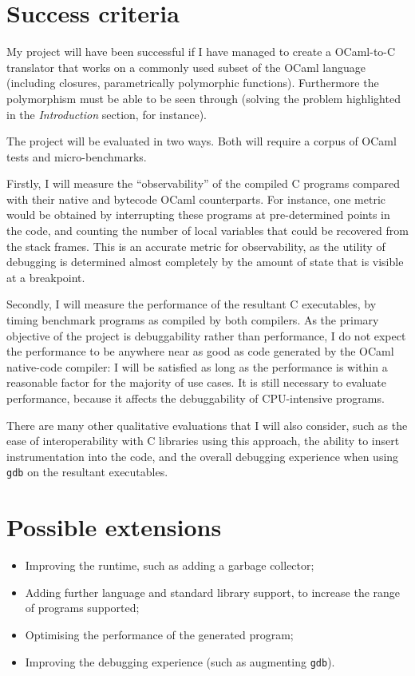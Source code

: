 \documentclass[12pt,twoside,a4paper]{article}
\begin{document}
\section*{Success criteria}

My project will have been successful if I have managed to create a OCaml-to-C translator that works on a commonly used subset of the OCaml language (including closures, parametrically polymorphic functions). Furthermore the polymorphism must be able to be seen through (solving the problem highlighted in the \textit{Introduction} section, for instance).

The project will be evaluated in two ways. Both will require a corpus of OCaml tests and micro-benchmarks.

Firstly, I will measure the ``observability'' of the compiled C programs compared with their native and bytecode OCaml counterparts. For instance, one metric would be obtained by interrupting these programs at pre-determined points in the code, and counting the number of local variables that could be recovered from the stack frames. This is an accurate metric for observability, as the utility of debugging is determined almost completely by the amount of state that is visible at a breakpoint.

Secondly, I will measure the performance of the resultant C executables, by timing benchmark programs as compiled by both compilers. As the primary objective of the project is debuggability rather than performance, I do not expect the performance to be anywhere near as good as code generated by the OCaml native-code compiler: I will be satisfied as long as the performance is within a reasonable factor for the majority of use cases. It is still necessary to evaluate performance, because it affects the debuggability of CPU-intensive programs.

There are many other qualitative evaluations that I will also consider, such as the ease of interoperability with C libraries using this approach, the ability to insert instrumentation into the code, and the overall debugging experience when using \lstinline{gdb} on the resultant executables.

\section*{Possible extensions}

\begin{itemize}
  \item Improving the runtime, such as adding a garbage collector;
  \item Adding further language and standard library support, to increase the range of programs supported;
  \item Optimising the performance of the generated program;
  \item Improving the debugging experience (such as augmenting \lstinline{gdb}).
\end{itemize}
\end{document}
